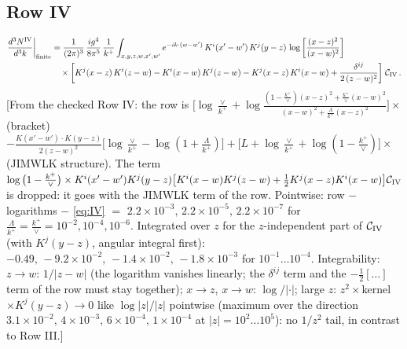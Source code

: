 \documentclass[9pt]{article}
\numberwithin{equation}{section}
\begin{document}
\subsection{Row IV}
\begin{align}
\frac{d^{3}N^{\rm IV}}{d^{3}k}\bigg|_{\rm finite} & = \frac{1}{(2\pi)^{3}}\,\frac{ig^{4}}{8\pi^{5}}\,\frac{1}{k^{+}}
\int_{x,y,z,w,x',w'}e^{-ik\cdot (w-w^\prime)}\,K^{i}(x'-w')\,K^{j}(y-z)\,\log\left[\frac{(x-z)^{2}}{(x-w)^{2}}\right]\notag\\
&\quad\times\bigg[K^{j}(x-z)\,K^{i}(z-w)-K^{i}(x-w)\,K^{j}(z-w)-K^{j}(x-z)\,K^{i}(x-w)+\frac{\delta^{ij}}{2\,(z-w)^{2}}\bigg]\;\mathcal{C}_{\rm IV}\,.\label{eq:IV}
\end{align}
{\color{gray}\small [From the checked Row IV: the row is $\big[\log\frac{\vee}{k^{+}}+\log\frac{(1-\frac{k^{+}}{\vee})(x-z)^{2}+\frac{k^{+}}{\vee}(x-w)^{2}}{(x-w)^{2}+\frac{\Lambda}{k^{+}}(x-z)^{2}}\big]\times$(bracket) $-\frac{K(x'-w')\cdot K(y-z)}{2(z-w)^{2}}\big[\log\frac{\vee}{k^{+}}-\log(1+\frac{\Lambda}{k^{+}})\big]+\big[L+\log\frac{\vee}{k^{+}}+\log(1-\frac{k^{+}}{\vee})\big]\times$(JIMWLK structure). The term $\log\big(1-\frac{k^{+}}{\vee}\big)\times K^{i}(x'-w')K^{j}(y-z)\big[K^{i}(x-w)K^{j}(z-w)+\frac12K^{j}(x-z)K^{i}(x-w)\big]\mathcal{C}_{\rm IV}$ is dropped: it goes with the JIMWLK term of the row. Pointwise: row $-$ logarithms $-$ \eqref{eq:IV} $=$ $2.2\times10^{-3},\,2.2\times10^{-5},\,2.2\times10^{-7}$ for $\frac{\Lambda}{k^{+}}=\frac{k^{+}}{\vee}=10^{-2},10^{-4},10^{-6}$. Integrated over $z$ for the $z$-independent part of $\mathcal{C}_{\rm IV}$ (with $K^{j}(y-z)$, angular integral first): $-0.49,\,-9.2\times10^{-2},\,-1.4\times10^{-2},\,-1.8\times10^{-3}$ for $10^{-1}\dots10^{-4}$. Integrability: $z\to w$: $1/|z-w|$ (the logarithm vanishes linearly; the $\delta^{ij}$ term and the $-\frac12[\dots]$ term of the row must stay together); $x\to z$, $x\to w$: $\log/|\cdot|$; large $z$: $z^{2}\times$kernel$\times K^{j}(y-z)\to0$ like $\log|z|/|z|$ pointwise (maximum over the direction $3.1\times10^{-2},\,4\times10^{-3},\,6\times10^{-4},\,1\times10^{-4}$ at $|z|=10^{2}\dots10^{5}$): no $1/z^{2}$ tail, in contrast to Row III.]}

\end{document}
